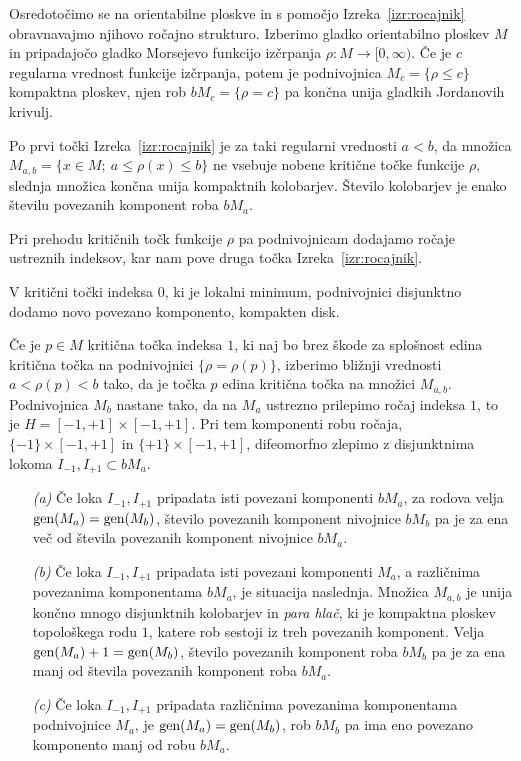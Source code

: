 \documentclass[12pt,a4paper,twoside]{article}
\theoremstyle{definition} %
\theoremstyle{plain} %
\numberwithin{equation}{section}  %
\begin{document}
Osredotočimo se na orientabilne ploskve in s pomočjo Izreka~\ref{izr:rocajnik} obravnavajmo njihovo ročajno strukturo. 
Izberimo gladko orientabilno ploskev $M$ in pripadajočo gladko Morsejevo funkcijo izčrpanja $\rho \colon M \to [0, \infty)$. Če je $c$ regularna vrednost funkcije izčrpanja, potem je podnivojnica $M_{c} = \{ \rho \leq c \}$ kompaktna ploskev, njen rob $bM_{c} = \{ \rho = c \}$ pa končna unija gladkih Jordanovih krivulj. 

Po prvi točki Izreka~\ref{izr:rocajnik} je za taki regularni vrednosti $a<b$, da množica $M_{a,b} = \{ x \in M; \ a \leq \rho(x) \leq b \}$ ne vsebuje nobene kritične točke funkcije $\rho$, slednja množica končna unija kompaktnih kolobarjev. Število kolobarjev je enako številu povezanih komponent roba $bM_{a}$.

Pri prehodu kritičnih točk funkcije $\rho$ pa podnivojnicam dodajamo ročaje ustreznih indeksov, kar nam pove druga točka Izreka~\ref{izr:rocajnik}.

V kritični točki indeksa $0$, ki je lokalni minimum, podnivojnici disjunktno dodamo novo povezano komponento, kompakten disk.

Če je $p \in M$ kritična točka indeksa $1$, ki naj bo brez škode za splošnost edina kritična točka na podnivojnici $\{ \rho = \rho(p) \}$, izberimo bližnji vrednosti $a<\rho(p)<b$ tako, da je točka $p$ edina kritična točka na množici $M_{a,b}$. Podnivojnica $M_{b}$ nastane tako, da na $M_{a}$ ustrezno prilepimo ročaj indeksa $1$, to je $H = [-1,+1] \times [-1,+1]$. Pri tem komponenti robu ročaja, $\{-1\} \times [-1,+1]$ in $\{+1\} \times [-1,+1]$, difeomorfno zlepimo z disjunktnima lokoma $I_{-1}, I_{+1} \subset bM_{a}$.
\begin{itemize}
\item[\textit{(a)}] 
	Če loka $I_{-1}, I_{+1}$ pripadata isti povezani komponenti $bM_{a}$, za rodova velja $\textup{gen}(M_{a}) = \textup{gen}(M_{b})$, število povezanih komponent nivojnice $bM_{b}$ pa je za ena več od števila povezanih komponent nivojnice $bM_{a}$.
\item[\textit{(b)}]
	Če loka $I_{-1}, I_{+1}$ pripadata isti povezani komponenti $M_{a}$, a različnima povezanima komponentama $bM_{a}$, je situacija naslednja.
	Množica $M_{a,b}$ je unija končno mnogo disjunktnih kolobarjev in \emph{para hlač}, ki je kompaktna ploskev topološkega rodu $1$, katere rob sestoji iz treh povezanih komponent.
	Velja $\textup{gen}(M_{a})+1 = \textup{gen}(M_{b})$, število povezanih komponent roba $bM_{b}$ pa je za ena manj od števila povezanih komponent roba $bM_{a}$.
\item[\textit{(c)}]
	Če loka $I_{-1}, I_{+1}$ pripadata različnima povezanima komponentama podnivojnice $M_{a}$, je $\textup{gen}(M_{a}) = \textup{gen}(M_{b})$, rob $bM_{b}$ pa ima eno povezano komponento manj od robu $bM_{a}$.
\end{itemize}
\end{document}
